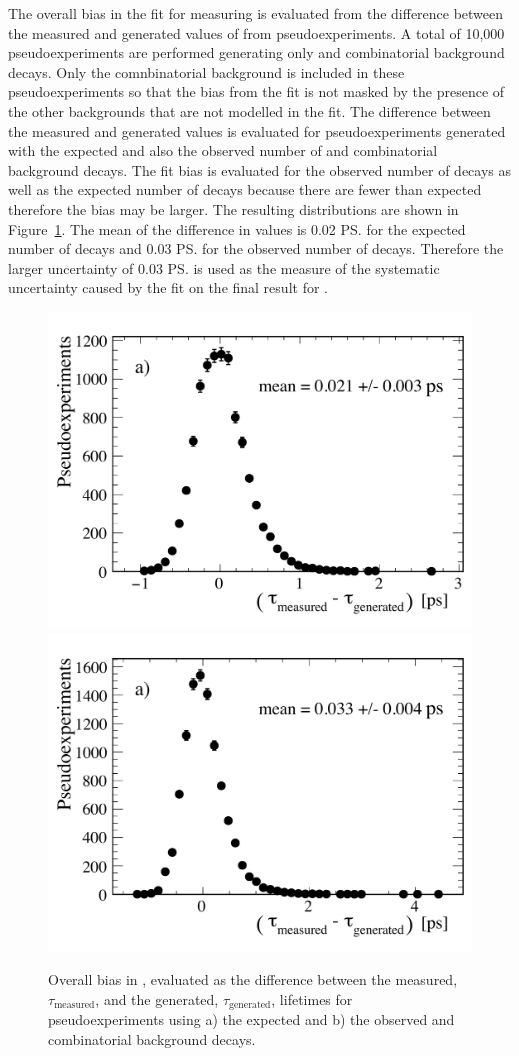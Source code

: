 The overall bias in the fit for measuring \tmumu is evaluated from the difference between the measured and generated values of \tmumu from pseudoexperiments. A total of 10,000 pseudoexperiments are performed generating only \bsmumu and combinatorial background decays. %
Only the comnbinatorial background is included in these pseudoexperiments so that the bias from the fit is not masked by the presence of the other backgrounds that are not modelled in the fit. The difference between the measured and generated \tmumu values is evaluated for pseudoexperiments generated with the expected and also the observed number of \bsmumu and combinatorial background decays. The fit bias is evaluated for the observed number of decays as well as the expected number of decays because there are fewer than expected therefore the bias may be larger. The resulting distributions are shown in Figure~\ref{fig:BsmumuYieldPulls}. The mean of the difference in \tmumu values is 0.02 \ps for the expected number of decays and 0.03 \ps for the observed number of decays. Therefore the larger uncertainty of 0.03 \ps is used as the measure of the systematic uncertainty caused by the fit on the final result for \tmumu. %

\begin{figure}[tbp]
    \centering
        \includegraphics[width=0.49 \textwidth]{./Figs/LifetimeSystematics/tau_meas-tau_gen_expected.pdf}
        \includegraphics[width=0.49 \textwidth]{./Figs/LifetimeSystematics/tau_meas_tau_gen_observed.pdf}
    \caption{Overall bias in \tmumu, evaluated as the difference between the measured, $\tau_\mathrm{{measured}}$, and the generated, $\tau_{\mathrm{generated}}$, lifetimes for pseudoexperiments using a) the expected and b) the observed  \bsmumu and combinatorial background decays.}
    \label{fig:BsmumuYieldPulls}
\end{figure}


